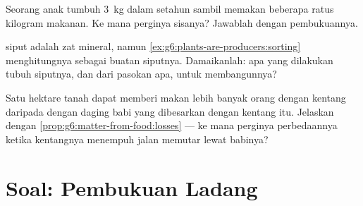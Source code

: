 \begin{exercise}[$\star\star$]\label{exo:g6:matter-from-food:10}
Seorang anak tumbuh \qty{3}{kg} dalam setahun sambil memakan beberapa
ratus kilogram makanan. Ke mana perginya sisanya? Jawablah dengan
pembukuannya.
\end{exercise}

\begin{exercise}[$\star\star$]\label{exo:g6:matter-from-food:11}
 siput adalah zat mineral, namun
\cref{ex:g6:plants-are-producers:sorting} menghitungnya sebagai buatan
siputnya. Damaikanlah: apa yang dilakukan tubuh siputnya, dan dari
pasokan apa, untuk membangunnya?
\end{exercise}

\begin{exercise}[$\star\star\star$]\label{exo:g6:matter-from-food:12}
Satu hektare tanah dapat memberi makan lebih banyak orang dengan
kentang daripada dengan daging babi yang dibesarkan dengan kentang
itu. Jelaskan dengan
\cref{prop:g6:matter-from-food:losses} --- ke mana perginya
perbedaannya ketika kentangnya menempuh jalan memutar lewat babinya?
\end{exercise}

\section{Soal: Pembukuan Ladang}

